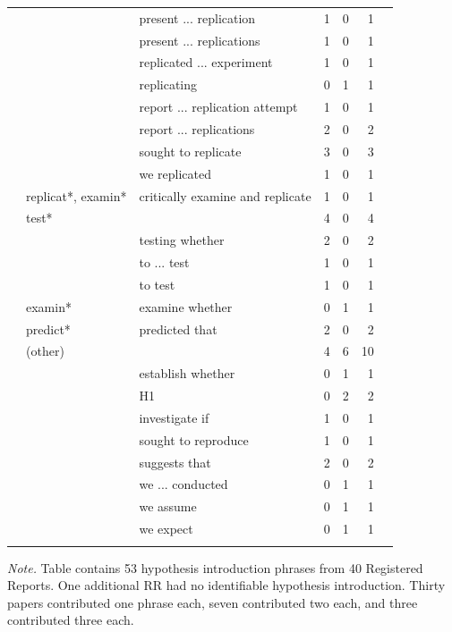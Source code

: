 \documentclass[british,,jou,floatsintext]{apa6}
\begin{document}
\begin{table}[tbp]
\begin{center}
\begin{threeparttable}
{\begin{tabular}{lllrrrr}
 &  & present ... replication & 1 & 0 & 1 & \\
 &  & present ... replications & 1 & 0 & 1 & \\
 &  & replicated ... experiment & 1 & 0 & 1 & \\
 &  & replicating & 0 & 1 & 1 & \\
 &  & report ... replication attempt & 1 & 0 & 1 & \\
 &  & report ... replications & 2 & 0 & 2 & \\
 &  & sought to replicate & 3 & 0 & 3 & \\
 &  & we replicated & 1 & 0 & 1 & \\ \midrule
 & replicat*, examin* & critically examine and replicate & 1 & 0 & 1 & \\ \midrule
 & test* &  & 4 & 0 & 4 & \\
 &  & testing whether & 2 & 0 & 2 & \\
 &  & to ... test & 1 & 0 & 1 & \\
 &  & to test & 1 & 0 & 1 & \\ \midrule
 & examin* & examine whether & 0 & 1 & 1 & \\ \midrule
 & predict* & predicted that & 2 & 0 & 2 & \\ \midrule
 & (other) &  & 4 & 6 & 10 & \\
 &  & establish whether & 0 & 1 & 1 & \\
 &  & H1 & 0 & 2 & 2 & \\
 &  & investigate if & 1 & 0 & 1 & \\
 &  & sought to reproduce & 1 & 0 & 1 & \\
 &  & suggests that & 2 & 0 & 2 & \\
 &  & we ... conducted & 0 & 1 & 1 & \\
 &  & we assume & 0 & 1 & 1 & \\
 &  & we expect & 0 & 1 & 1 & \\
\bottomrule
\addlinespace
\end{tabular}

}

\begin{tablenotes}[para]
\normalsize{\textit{Note.} Table contains 53 hypothesis introduction phrases from 40 Registered Reports. One additional RR had no identifiable hypothesis introduction. Thirty papers contributed one phrase each, seven contributed two each, and three contributed three each.}
\end{tablenotes}

\end{threeparttable}
\end{center}

\end{table}
\end{document}
